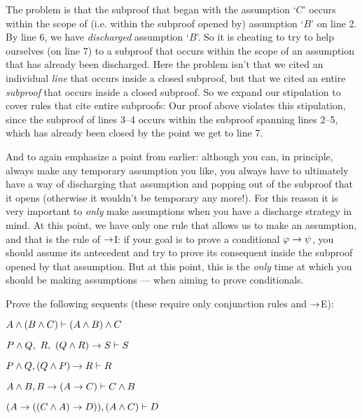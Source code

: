 The problem is that the subproof that began with the assumption `$C$' occurs within the scope of (i.e. within the subproof opened by) assumption `$B$' on line 2. By line 6, we have \emph{discharged} assumption `$B$'. So it is cheating to try to help ourselves (on line 7) to a subproof that occurs within the scope of an assumption that has already been discharged.  Here the problem isn't that we cited an individual \emph{line} that occurs inside a closed subproof, but that we cited an entire \emph{subproof} that occurs inside a closed subproof.  So we expand our stipulation to cover rules that cite entire subproofs:
Our proof above violates this stipulation, since the subproof of lines 3--4 occurs within the subproof spanning lines 2--5, which has already been closed by the point we get to line 7.


And to again emphasize a point from earlier: although you can, in principle, always make any temporary assumption you like, you always have to ultimately have a way of discharging that assumption and popping out of the subproof that it opens (otherwise it wouldn't be temporary any more!).    For this reason it is very important to \emph{only}  make assumptions when you have a discharge strategy in mind.  At this point, we have only one rule that allows us to make an assumption, and that is the rule of $\rightarrow$I: if your goal is to prove a conditional $\mathcal{\varphi} \rightarrow \mathcal{\psi}$, you should assume its antecedent \meta{\varphi} and try to prove its consequent \meta{\psi} inside the subproof opened by that assumption.  But at this point, this is the \emph{only} time at which you should be making assumptions --- when aiming to prove conditionals.

\practiceproblems
\problempart
Prove the following sequents (these require only conjunction rules and $\rightarrow$E):

\begin{earg}
\item $A \wedge (B \wedge C) \vdash (A \land B) \wedge C$
\item $P \wedge  Q, \ R, \ (Q \wedge  R) \rightarrow S \vdash S$
\item $P \wedge Q, (Q \wedge P) \rightarrow R \vdash R$
\item $A \wedge B, B \rightarrow (A \rightarrow C) \vdash C \wedge B$
 \item $(A\rightarrow ((C\wedge  A)\rightarrow D)), (A\wedge  C) \vdash D$
\end{earg}


